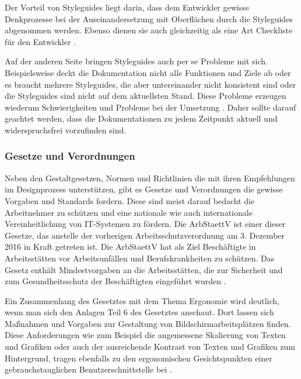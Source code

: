 Der Vorteil von Styleguides liegt darin, dass dem Entwickler gewisse Denkprozesse bei der Auseinandersetzung mit Oberflächen durch die Styleguides abgenommen werden. Ebenso dienen sie auch gleichzeitig als eine Art Checkliste für den Entwickler \citep[vgl.][214]{Thomaschewski2013}.

Auf der anderen Seite bringen Styleguides auch per se Probleme mit sich. Beispielsweise deckt die Dokumentation nicht alle Funktionen und Ziele ab oder es braucht mehrere Styleguides, die aber untereinander nicht konsistent sind oder die Styleguides sind nicht auf dem aktuellsten Stand. Diese Probleme erzeugen wiederum Schwierigkeiten und Probleme bei der Umsetzung \citep[vgl.][215]{Thomaschewski2013}. Daher sollte darauf geachtet werden, dass die Dokumentationen zu jedem Zeitpunkt aktuell und widerspruchsfrei vorzufinden sind.


\subsubsection{Gesetze und Verordnungen}

Neben den Gestaltgesetzen, Normen und Richtlinien die mit ihren Empfehlungen im Designprozess unterstützen, gibt es Gesetze und Verordnungen die gewisse Vorgaben und Standards fordern. Diese sind meist darauf bedacht die Arbeitnehmer zu schützen und eine nationale wie auch internationale Vereinheitlichung von IT-Systemen zu fördern. Die \gls{ArbStaettV} ist einer dieser Gesetze, das anstelle der vorherigen Arbeitsschutzverordnung am 3. Dezember 2016 in Kraft getreten ist. Die \gls{ArbStaettV} hat als Ziel Beschäftigte in Arbeitsstätten vor Arbeitsunfällen und Berufskrankheiten zu schützen. Das Gesetz enthält Mindestvorgaben an die Arbeitsstätten, die zur Sicherheit und zum Gesundheitsschutz der Beschäftigten eingeführt wurden \citep[vgl.][]{BAuA}. 

Ein Zusammenhang des Gesetztes mit dem Thema Ergonomie wird deutlich, wenn man sich den Anlagen Teil 6 des Gesetztes anschaut. Dort lassen sich Maßnahmen und Vorgaben zur Gestaltung von Bildschirmarbeitsplätzen finden. Diese Anforderungen wie zum Beispiel die angemessene Skalierung von Texten und Grafiken oder auch der ausreichende Kontrast von Texten und Grafiken zum Hintergrund, tragen ebenfalls zu den ergonomischen Gesichtspunkten einer gebrauchstauglichen Benutzerschnittstelle bei \citep[vgl.][Anhang: Kap. 6]{ArbStaettV}.

